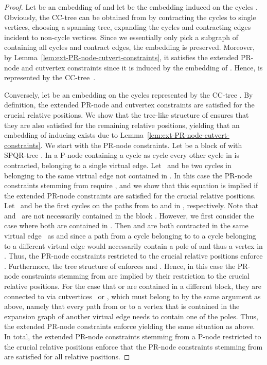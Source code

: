 \documentclass{scrartcl}
\newcommand{\1}[1]{{\normalfont \ensuremath{#1^{\tiny\circled{1}}}}} \newcommand{\2}[1]{{\normalfont \ensuremath{#1^{\tiny\circled{2}}}}} \renewcommand{\k}[1]{{\normalfont \ensuremath{#1^{\tiny\circled{k}}}}} \newcommand{\proj}[2]{\ensuremath{\left.#1\right|_{#2}}} \newcommand{\eps}{\varepsilon}
\theoremstyle{plain} \newtheorem{theorem}{Theorem} \newcounter{lemmacounter} \setcounter{lemmacounter}{0} \newtheorem{lemma}[lemmacounter]{Lemma} \newtheorem{fact}{Fact}  \newtheorem{corollary}{Corollary} \theoremstyle{definition} \newtheorem{definition}{Definition}
\begin{document}
\begin{proof}
  Let  be an embedding of  and let  be the embedding induced on the cycles .  Obviously, the CC-tree  can be obtained from  by contracting the cycles  to single vertices, choosing a spanning tree, expanding the
  cycles and contracting edges incident to non-cycle vertices.  Since
  we essentially only pick a subgraph of  containing all cycles
   and contract edges, the embedding
   is preserved.  Moreover, by
  Lemma~\ref{lem:ext-PR-node-cutvert-constraints}, it satisfies the
  extended PR-node and cutvertex constraints since it is induced by
  the embedding  of .  Hence, 
  is represented by the CC-tree~.

  Conversely, let  be an embedding on the
  cycles represented by the CC-tree .  By
  definition, the extended PR-node and cutvertex constraints are
  satisfied for the crucial relative positions.  We show that the
  tree-like structure of  ensures that they
  are also satisfied for the remaining relative positions, yielding
  that an embedding  of  inducing  exists due to Lemma~\ref{lem:ext-PR-node-cutvert-constraints}.
  We start with the PR-node constraints.  Let  be a block of 
  with SPQR-tree .  In a P-node  containing a
  cycle  as cycle  every other cycle in  is contracted,
  belonging to a single virtual edge.  Let~ and  be two
  cycles in  belonging to the same virtual edge  not
  contained in .  In this case the PR-node constraints
  stemming from  require , and we show
  that this equation is implied if the extended PR-node constraints
  are satisfied for the crucial relative positions.  Let~ and
   be the first cycles on the paths from  to  and 
  in , respectively.  Note that~
  and~ are not necessarily contained in the block .  However,
  we first consider the case where both are contained in .  Then
   and  are both contracted in the same virtual
  edge~ as  and  since a path from a cycle belonging
  to  to a cycle belonging to a different virtual edge would
  necessarily contain a pole of  and thus a vertex in .
  Thus, the PR-node constraints restricted to the crucial relative
  positions enforce .  Furthermore,
  the tree structure of  enforces
   and .  Hence, in this case the PR-node constraints
  stemming from  are implied by their restriction to the crucial
  relative positions.  For the case that  or  are contained
  in a different block, they are connected to  via
  cutvertices~ or , which must belong to  by the
  same argument as above, namely that every path from  or  to a
  vertex that is contained in the expansion graph of another virtual
  edge needs to contain one of the poles.  Thus, the extended PR-node
  constraints enforce  yielding the
  same situation as above.  In total, the extended PR-node constraints
  stemming from a P-node  restricted to the crucial relative
  positions enforce that the PR-node constraints stemming from 
  are satisfied for all relative positions.


\end{proof}
\end{document}
